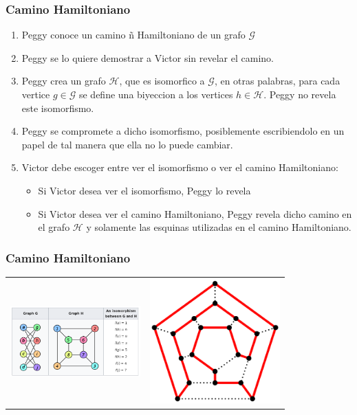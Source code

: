 \documentclass{beamer}
\begin{document}
\begin{frame}
    \frametitle{Camino Hamiltoniano}
    \begin{enumerate}
        \item{Peggy conoce un camino \~n Hamiltoniano de un grafo $\mathcal{G}$}
        \item{Peggy se lo quiere demostrar a Victor sin revelar el camino.}
        \item{Peggy crea un grafo $\mathcal{H}$, que es isomorfico a $\mathcal{G}$,
        en otras palabras, para cada vertice $g\in\mathcal{G}$ se define una biyeccion
        a los vertices $h\in\mathcal{H}$. Peggy no revela este isomorfismo.}
        \item{Peggy se compromete a dicho isomorfismo, posiblemente escribiendolo en
        un papel de tal manera que ella no lo puede cambiar.}
        \item{Victor debe escoger entre ver el isomorfismo o ver el camino Hamiltoniano:
            \begin{itemize}
                \item{Si Victor desea ver el isomorfismo, Peggy lo revela}
                \item{Si Victor desea ver el camino Hamiltoniano, Peggy revela
                dicho camino en el grafo $\mathcal{H}$ y solamente las esquinas
                utilizadas en el camino Hamiltoniano.}
            \end{itemize}
        }
    \end{enumerate}
\end{frame}

\begin{frame}
    \frametitle{Camino Hamiltoniano}
    \begin{tabular}{p{5cm} p{5cm}}
        \includegraphics[width=5cm]{iso.png}
        & \includegraphics[width=5cm]{ham.png}
    \end{tabular}
\end{frame}
\end{document}
